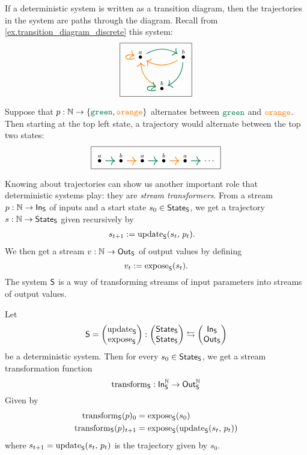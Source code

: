 \documentclass[DynamicalBook]{subfiles}
\begin{document}
\begin{example}\label{ex.transition_diagram_discrete_traj}
If a deterministic system is written as a transition diagram, then the
trajectories in the system are paths through the diagram. Recall from
\cref{ex.transition_diagram_discrete} this system:
\[
\begin{tikzpicture}
	\node[draw] {
  \begin{tikzcd}[column sep=small]
  	\LMO{a}\ar[rr, dgreen, thick, bend left]\ar[loop left, thick, orange]&&
  	\LMO{b}\ar[ll, thick, orange, bend left]\ar[dl, bend left, thick, dgreen]\\&
  	\LMO{b} \ar[ul, thick, orange, bend left] \ar[loop left, thick, dgreen]
  \end{tikzcd}
  };
\end{tikzpicture}
\]

Suppose that $p : \nn \to \{\Green, \Orange\}$
alternates between $\Green$ and ${\color{orange} \mathtt{orange}}$. Then
starting at the top left state, a trajectory would alternate between the top two
states:
\[
\begin{tikzpicture}
	\node[draw] {
  \begin{tikzcd}[column sep=small]
    \LMO{a} \ar[r, dgreen, thick] & \LMO{b} \ar[r, orange, thick] & \LMO{a} \ar[r, dgreen,thick] & \LMO{b} \ar[r, orange, thick] & \LMO{a} \ar[r, dgreen, thick] & \cdots
  \end{tikzcd}
  };
\end{tikzpicture}
\]

\end{example}

Knowing about trajectories can show us another important role that deterministic
systems play: they are \emph{stream transformers}. From a stream $p : \mathbb{N} \to
\mathsf{In}_{\mathsf{S}}$ of inputs and a start state $s_0 \in \mathsf{State}_{\mathsf{S}}$, we get a trajectory $s
: \mathbb{N} \to \mathsf{State}_{\mathsf{S}}$ given recursively by
\begin{align*}
  s_{t+1} &:= \mathrm{update}_{\mathsf{S}}(s_t,\, p_t).
\end{align*}
We then get a stream $v : \mathbb{N} \to \mathsf{Out}_{\mathsf{S}}$ of output values by defining
$$v_t := \mathrm{expose}_{\mathsf{S}}(s_t).$$
The system $\mathsf{S}$ is a way of transforming streams of input parameters into
streams of output values.
\begin{proposition}
 Let $$\mathsf{S} = \begin{pmatrix}{\mathrm{update}_{\mathsf{S}}} \\ {\mathrm{expose}_{\mathsf{S}}} \end{pmatrix} : \begin{pmatrix}{\mathsf{State}_{\mathsf{S}}} \\ {\mathsf{State}_{\mathsf{S}}} \end{pmatrix}
 \leftrightarrows \begin{pmatrix}{\mathsf{In}_{\mathsf{S}}} \\ {\mathsf{Out}_{\mathsf{S}}} \end{pmatrix}$$
 be a deterministic system. Then for every $s_0 \in \mathsf{State}_{\mathsf{S}}$, we get a stream
 transformation function
 $$\mathrm{transform}_{\mathsf{S}} : \mathsf{In}_{\mathsf{S}}^{\mathbb{N}} \to \mathsf{Out}_{\mathsf{S}}^{\mathbb{N}}$$
 Given by
 \begin{align*}
   \mathrm{transform}_{\mathsf{S}}(p)_0 &= \mathrm{expose}_{\mathsf{S}}(s_0)\\
   \mathrm{transform}_{\mathsf{S}}(p)_{t + 1} &= \mathrm{expose}_{\mathsf{S}}(\mathrm{update}_{\mathsf{S}}(s_t,\, p_t))
 \end{align*}
 where $s_{t+1} = \mathrm{update}_{\mathsf{S}}({s_t,\, p_t})$ is the trajectory given by $s_0$.
\end{proposition}
\end{document}
